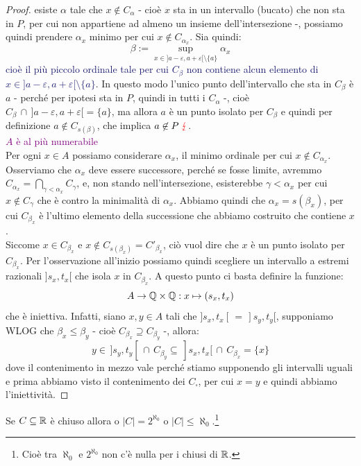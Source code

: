 \begin{proof}
	esiste $\alpha$ tale che $x \not \in C_\alpha$ - cioè $x$ sta in un intervallo (bucato) che non sta in $P$, per cui non appartiene ad almeno un insieme dell'intersezione -, possiamo quindi prendere $\alpha_x$ minimo per cui $x \not \in C_{\alpha_x}$.
	Sia quindi:
	\[ \beta := \sup_{x \in ]a - \varepsilon, a + \varepsilon[ \setminus\{a\}} \alpha_x
		\]
	\textcolor{MidnightBlue}{cioè il più piccolo ordinale tale per cui $C_\beta$ non contiene alcun elemento di $x \in ]a - \varepsilon, a + \varepsilon[ \setminus\{a\}$}.
	In questo modo l'unico punto dell'intervallo che sta in $C_\beta$ è $a$ - perché per ipotesi sta in $P$, quindi in tutti i $C_\alpha$ -, cioè $C_\beta \,\cap\, ]a - \varepsilon, a + \varepsilon[ = \{a\}$, ma allora $a$ è un punto isolato per $C_\beta$ e quindi per definizione $a \not \in C_{s(\beta)}$, che implica $a \not \in P \;\textcolor{red}{\lightning}$.\\
	\textcolor{purple}{$A$ è al più numerabile}\\
	Per ogni $x \in A$ possiamo considerare $\alpha_x$, il minimo ordinale per cui $x \not \in C_{\alpha_x}$. Osserviamo che $\alpha_x$ deve essere successore,
	perché se fosse limite, avremmo $C_{\alpha_x} = \bigcap_{\gamma < \alpha_x} C_\gamma$, e, non stando nell'intersezione, esisterebbe $\gamma < \alpha_x$ per cui $x \not \in C_\gamma$ che è contro la minimalità di $\alpha_x$.
	Abbiamo quindi che $\alpha_x = s(\beta_x)$, per cui $C_{\beta_x}$ è l'ultimo elemento della successione che abbiamo costruito che contiene $x$.\\
	Siccome $x \in C_{\beta_x}$ e $x \not\in C_{s(\beta_x)} = C'_{\beta_x}$, ciò vuol dire che $x$ è un punto isolato per $C_{\beta_x}$. Per l'osservazione all'inizio possiamo quindi scegliere un intervallo a estremi razionali $]s_x,t_x[$ che isola $x$ in $C_{\beta_x}$.
	A questo punto ci basta definire la funzione:
	\[ A \to \mathbb Q \times \mathbb Q : x \mapsto (s_x,t_x)
		\]
	che è iniettiva. Infatti, siano $x,y \in A$ tali che $]s_x,t_x[ \,=\, ]s_y,t_y[$, supponiamo WLOG che $\beta_x \leq \beta_y$ - cioè $C_{\beta_x} \supseteq C_{\beta_y}$ -, allora:
	\[ y \in\, ]s_y,t_y[ \, \cap \, C_{\beta_y} \subseteq \, ]s_x,t_x[ \, \cap \, C_{\beta_x} = \{x\}
		\]
	dove il contenimento in mezzo vale perché stiamo supponendo gli intervalli uguali e prima abbiamo visto il contenimento dei $C_{\square}$, per cui $x = y$ e quindi abbiamo l'iniettività.
\end{proof}

\begin{corollary}
	Se $C \subseteq \mathbb R$ è chiuso allora o $|C|=2^{\aleph_0}$ o $|C| \leq \aleph_0$.\footnote{Cioè tra $\aleph_0$ e $2^{\aleph_0}$ non c'è nulla per i chiusi di $\mathbb R$.}
\end{corollary}

